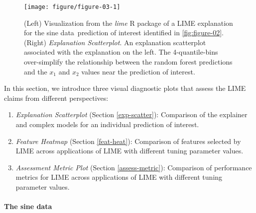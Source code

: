 \documentclass[AMS,STIX2COL]{WileyNJD-v2}\usepackage[]{graphicx}\usepackage[]{color}
\newenvironment{knitrout}{}{} %
\newcommand{\data}{sine data}
\begin{document}
\begin{figure}[!thp]
\begin{knitrout}
\color{fgcolor}

{\centering \texttt{[image: figure/figure-03-1]} 

}



\end{knitrout}
\caption{(Left) Visualization from the \emph{lime} R package of a LIME explanation for the \data \ prediction of interest identified in \autoref{fig:figure-02}. (Right) \emph{Explanation Scatterplot}.  An explanation scatterplot associated with the explanation on the left. The 4-quantile-bins over-simplify the relationship between the random forest predictions and the $x_1$ and $x_2$ values near the prediction of interest.}
\label{fig:figure-03}
\end{figure}

In this section, we introduce three visual diagnostic plots that assess the LIME claims from different perspectives:

\begin{enumerate}
\item \emph{Explanation Scatterplot} (Section \ref{exp-scatter}): Comparison of the explainer and complex models for an individual prediction of interest.
\item \emph{Feature Heatmap} (Section \ref{feat-heat}): Comparison of features selected by LIME across applications of LIME with different tuning parameter values.
\item \emph{Assessment Metric Plot} (Section \ref{assess-metric}): Comparison of performance metrics for LIME across applications of LIME with different tuning parameter values. 
\end{enumerate}

\paragraph{The \data}
\end{document}

